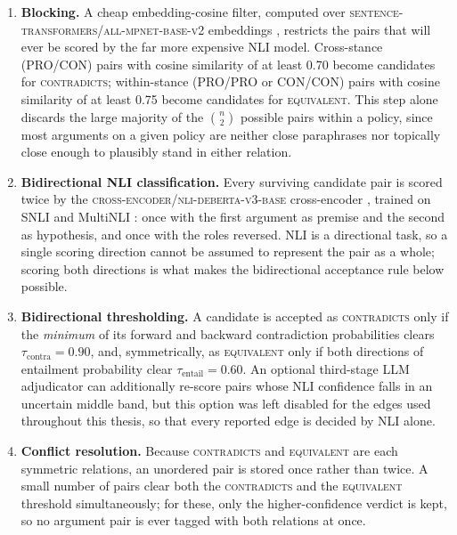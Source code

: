 \begin{enumerate}
\item \textbf{Blocking.} A cheap embedding-cosine filter, computed over
\textsc{sentence-transformers/all-mpnet-base-v2} embeddings \cite{reimers2019sbert,song2020mpnet},
restricts the pairs that will ever be scored by the far more expensive NLI model. Cross-stance
(PRO/CON) pairs with cosine similarity of at least 0.70 become candidates for
\textsc{contradicts}; within-stance (PRO/PRO or CON/CON) pairs with cosine similarity of at least
0.75 become candidates for \textsc{equivalent}. This step alone discards the large majority of the
$\binom{n}{2}$ possible pairs within a policy, since most arguments on a given policy are neither
close paraphrases nor topically close enough to plausibly stand in either relation.

\item \textbf{Bidirectional NLI classification.} Every surviving candidate pair is scored twice by
the \textsc{cross-encoder/nli-deberta-v3-base} cross-encoder \cite{he2023debertav3}, trained on
SNLI and MultiNLI \cite{bowman2015snli,williams2018mnli}: once with the first argument as premise
and the second as hypothesis, and once with the roles reversed. NLI is a directional task, so a
single scoring direction cannot be assumed to represent the pair as a whole; scoring both
directions is what makes the bidirectional acceptance rule below possible.

\item \textbf{Bidirectional thresholding.} A candidate is accepted as \textsc{contradicts} only if
the \emph{minimum} of its forward and backward contradiction probabilities clears
$\tau_{\text{contra}} = 0.90$, and, symmetrically, as \textsc{equivalent} only if both directions
of entailment probability clear $\tau_{\text{entail}} = 0.60$. An optional third-stage LLM
adjudicator can additionally re-score pairs whose NLI confidence falls in an uncertain middle
band, but this option was left disabled for the edges used throughout this thesis, so that every
reported edge is decided by NLI alone.

\item \textbf{Conflict resolution.} Because \textsc{contradicts} and \textsc{equivalent} are each
symmetric relations, an unordered pair is stored once rather than twice. A small number of pairs
clear both the \textsc{contradicts} and the \textsc{equivalent} threshold simultaneously; for
these, only the higher-confidence verdict is kept, so no argument pair is ever tagged with both
relations at once.
\end{enumerate}

